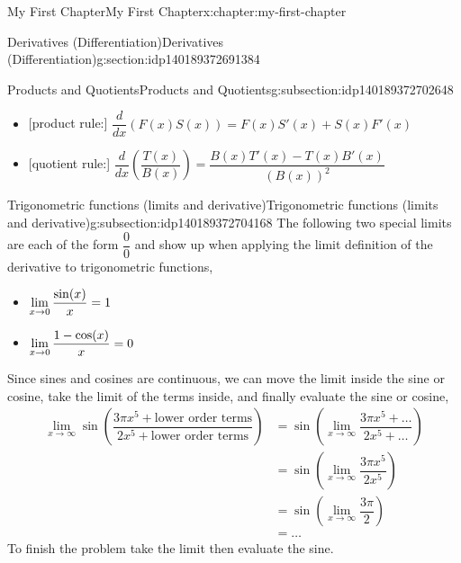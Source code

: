\documentclass[oneside,10pt,]{book}
\newcommand{\amp}{&}
\begin{document}
\begin{chapterptx}{My First Chapter}{}{My First Chapter}{}{}{x:chapter:my-first-chapter}
\begin{sectionptx}{Derivatives (Differentiation)}{}{Derivatives (Differentiation)}{}{}{g:section:idp140189372691384}
\typeout{************************************************}
%
\begin{subsectionptx}{Products and Quotients}{}{Products and Quotients}{}{}{g:subsection:idp140189372702648}
%
\begin{itemize}[label=\textbullet]
\item{}[product rule:] \(\displaystyle \dfrac{d}{dx}\left(F(x)S(x)\right) = F(x)S'(x) + S(x)F'(x)\)%
\item{}[quotient rule:] \(\displaystyle \dfrac{d}{dx}\left(\dfrac{T(x)}{B(x)}\right) = \dfrac{B(x)T'(x) - T(x)B'(x)}{(B(x))^2}\)%
\end{itemize}
\end{subsectionptx}
%
%
\typeout{************************************************}
\typeout{************************************************}
%
\begin{subsectionptx}{Trigonometric functions (limits and derivative)}{}{Trigonometric functions (limits and derivative)}{}{}{g:subsection:idp140189372704168}
The following two special limits are each of the form \(\dfrac{0}{0}\) and show up when applying the limit definition of the derivative to trigonometric functions,%
\begin{itemize}[label=\textbullet]
\item{}\(\displaystyle \displaystyle\lim_{x\to0}\dfrac{\sin(x)}{x} = 1\)%
\item{}\(\displaystyle \displaystyle\lim_{x\to0}\dfrac{1-\cos(x)}{x} = 0\)%
\end{itemize}
%
\par
Since sines and cosines are continuous, we can move the limit inside the sine or cosine, take the limit of the terms inside, and finally evaluate the sine or cosine,%
\begin{equation*}
\begin{aligned}
\displaystyle\lim_{x\to\infty}\sin\left(\dfrac{3\pi x^5+ \text{lower order terms}}{2x^5+\text{lower order terms}}\right)
\amp = \sin\left(\lim_{x\to\infty}\dfrac{3\pi x^5+\dots}{2x^5+\dots}\right)\\
\amp = \sin\left(\lim_{x\to\infty}\dfrac{3\pi x^5}{2x^5}\right)\\
\amp = \sin\left(\lim_{x\to\infty}\dfrac{3\pi}{2}\right)\\
\amp = \dots
\end{aligned}
\end{equation*}
To finish the problem take the limit then evaluate the sine.%
%
\begin{itemize}[label=\textbullet]

\end{itemize}
\end{subsectionptx}
\end{sectionptx}
\end{chapterptx}
\end{document}
